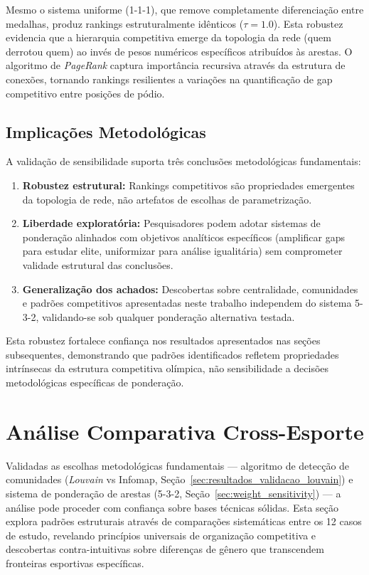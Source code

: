Mesmo o sistema uniforme (1-1-1), que remove completamente diferenciação entre medalhas, produz rankings estruturalmente idênticos ($\tau = 1.0$). Esta robustez evidencia que a hierarquia competitiva emerge da topologia da rede (quem derrotou quem) ao invés de pesos numéricos específicos atribuídos às arestas. O algoritmo de \textit{PageRank}{} captura importância recursiva através da estrutura de conexões, tornando rankings resilientes a variações na quantificação de gap competitivo entre posições de pódio.

\subsection{Implicações Metodológicas}

A validação de sensibilidade suporta três conclusões metodológicas fundamentais:

\begin{enumerate}
    \item \textbf{Robustez estrutural:} Rankings competitivos são propriedades emergentes da topologia de rede, não artefatos de escolhas de parametrização.

    \item \textbf{Liberdade exploratória:} Pesquisadores podem adotar sistemas de ponderação alinhados com objetivos analíticos específicos (amplificar gaps para estudar elite, uniformizar para análise igualitária) sem comprometer validade estrutural das conclusões.

    \item \textbf{Generalização dos achados:} Descobertas sobre centralidade, comunidades e padrões competitivos apresentadas neste trabalho independem do sistema 5-3-2, validando-se sob qualquer ponderação alternativa testada.
\end{enumerate}

Esta robustez fortalece confiança nos resultados apresentados nas seções subsequentes, demonstrando que padrões identificados refletem propriedades intrínsecas da estrutura competitiva olímpica, não sensibilidade a decisões metodológicas específicas de ponderação.

\section{Análise Comparativa Cross-Esporte}

Validadas as escolhas metodológicas fundamentais --- algoritmo de detecção de comunidades (\textit{Louvain} vs Infomap, Seção~\ref{sec:resultados_validacao_louvain}) e sistema de ponderação de arestas (5-3-2, Seção~\ref{sec:weight_sensitivity}) --- a análise pode proceder com confiança sobre bases técnicas sólidas. Esta seção explora padrões estruturais através de comparações sistemáticas entre os 12 casos de estudo, revelando princípios universais de organização competitiva e descobertas contra-intuitivas sobre diferenças de gênero que transcendem fronteiras esportivas específicas.

